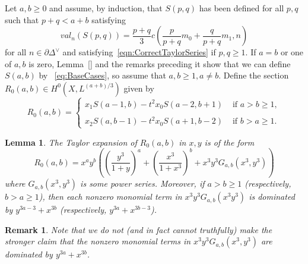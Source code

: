 \documentclass{article}
\newtheorem{lemma}{Lemma}
\newtheorem{rem}{Remark}
\begin{document}
Let $a,b\geq 0$ and assume, by induction, that $S(p,q)$ has been defined for all $p,q$ such that $p+q < a+b$ satisfying 
\[
val_n(S(p,q)) = \frac{p+q}{3}c\left(\frac{p}{p+q}m_0+\frac{q}{p+q}m_1,n\right)
\]
for all $n\in\partial\Delta^\vee$ and satisfying~\eqref{eqn:CorrectTaylorSeries} if $p,q\geq 1$. If $a=b$ or one of $a,b$ is zero, Lemma~\ref{} and the remarks preceding it show that we can define $S(a,b)$ by ~\eqref{eq:BaseCases}, so assume that $a,b\geq 1, a\neq b$. Define the section $R_0(a,b)\in H^0(X,L^{(a+b)/3})$ given by 
\[
R_0(a,b) = \begin{cases}
    x_1S(a-1,b)-t^2x_0S(a-2,b+1) & \textrm{ if } a>b\geq 1,\\
    \\
    x_2S(a,b-1)-t^2x_0S(a+1,b-2) & \textrm{ if } b > a\geq 1.
\end{cases}
\]
\begin{lemma}\label{lemma:R_0(a,b)}
    The Taylor expansion of $R_0(a,b)$ in $x,y$ is of the form
    \[
    R_0(a,b)=x^ay^b\left(\left(\frac{y^3}{1+y}\right)^{a}+\left(\frac{x^3}{1+x^3}\right)^{b}+x^3y^3G_{a,b}(x^3,y^3)\right)
    \]
    where $G_{a,b}(x^3,y^3)$ is some power series. Moreover, if $a>b\geq1$ (respectively, $b>a\geq 1$), then each nonzero monomial term in $x^3y^3G_{a,b}(x^3y^3)$ is dominated by $y^{3a-3}+x^{3b}$ (respectively, $y^{3a}+x^{3b-3}$).
\end{lemma}
\begin{rem}
    Note that we do not (and in fact cannot truthfully) make the stronger claim that the nonzero monomial terms in $x^3y^3G_{a,b}(x^3,y^3)$ are dominated by $y^{3a}+x^{3b}$.
\end{rem}
\end{document}
